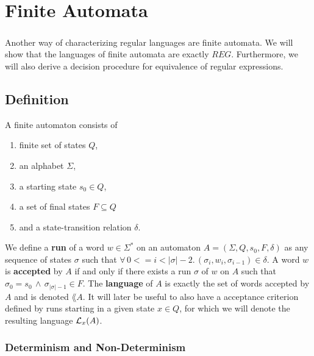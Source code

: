 \documentclass[11pt,a4paper,oneside]{book}
\begin{document}
            

    \chapter{Finite Automata}
        \paragraph{} 
        Another way of characterizing regular languages are finite automata. 
        We will show that the languages of finite automata are exactly $REG$. 
        Furthermore, we will also derive a decision procedure for equivalence of regular expressions.

        \section{Definition}
            A finite automaton consists of
            \begin{enumerate}
                \item
                    finite set of states $Q$, 
                \item 
                    an alphabet $\Sigma$, 
                \item 
                    a starting state $s_0 \in Q$, 
                \item 
                    a set of final states $F \subseteq Q$ 
                \item 
                    and a state-transition relation $\delta$. \cite{DBLP:books/daglib/0011126}
            \end{enumerate}

                We define a \textbf{run} of a word $w \in \Sigma^*$ on an automaton $A = (\Sigma, Q, s_0, F, \delta)$ as any sequence of states $\sigma$ such that 
                $\forall \, 0 <= i < \vert\sigma\vert-2. \, (\sigma_i, w_i, \sigma_{i-1}) \in \delta$.
            A word $w$ is \textbf{accepted} by $A$ if and only if there exists a run $\sigma$ of $w$ on $A$ such that $\sigma_0 = s_0 \, \wedge \, \sigma_{\vert\sigma\vert-1} \in F$.
            The \textbf{language} of $A$ is exactly the set of words accepted by $A$ and is denoted $\lang{A}$. 
            It will later be useful to also have a acceptance criterion defined by runs starting in a given state $x \in Q$, for which we will denote the resulting language $\mathcal{L}_x(A)$.

            \subsection{Determinism and Non-Determinism}
                
\end{document}
